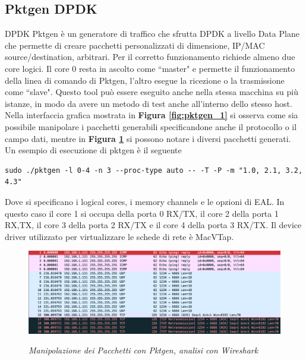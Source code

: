 \subsection*{Pktgen DPDK}
DPDK Pktgen è un generatore di traffico che sfrutta DPDK a livello Data Plane che permette di creare pacchetti personalizzati di dimensione, IP/MAC source/destination, arbitrari.
Per il corretto funzionamento richiede almeno due core logici. Il core 0 resta in ascolto come ``master" e permette il funzionamento della linea di comando di Pktgen, l'altro esegue la ricezione o la trasmissione come ``slave". Questo tool può essere eseguito anche nella stessa macchina su più istanze, in modo da avere un metodo di test anche all'interno dello stesso host.
Nella interfaccia grafica mostrata in \textbf{{Figura \ref{fig:pktgen_1}}}
 si osserva come sia possibile manipolare i pacchetti generabili specificandone anche il protocollo o il campo dati, mentre in \textbf{{Figura \ref{fig:wireshark}}} si possono notare i diversi pacchetti generati.
Un esempio di esecuzione di pktgen è il seguente
\begin{verbatim}
sudo ./pktgen -l 0-4 -n 3 --proc-type auto -- -T -P -m "1.0, 2.1, 3.2, 4.3"
\end{verbatim}
Dove si specificano i logical cores, i memory channels e le opzioni di EAL. In questo caso il core 1 si occupa della porta 0 RX/TX, il core 2 della porta 1 RX,TX, il core 3 della porta 2 RX/TX e il core 4 della porta 3 RX/TX.
\leavevmode\newline
Il device driver utilizzato per virtualizzare le schede di rete è MacVTap.
\vspace{0.5mm}
\FloatBarrier
\begin{figure}[h]
\includegraphics[scale=0.25]{images/wireshark.png} 
\centering
\caption{\textit{Manipolazione dei Pacchetti con Pktgen, analisi con Wireshark}} \cite{noauthor_wireshark_nodate}
\label{fig:wireshark}
\vspace{1cm}
\end{figure}
\FloatBarrier

